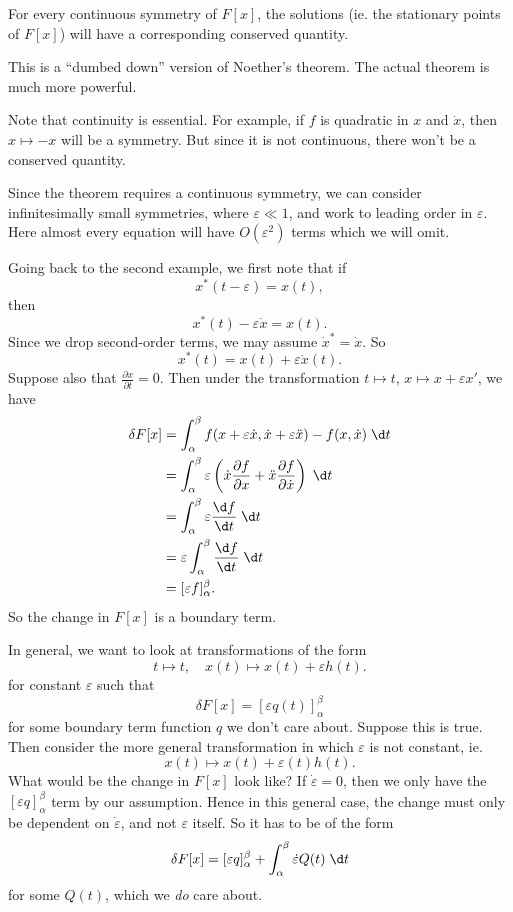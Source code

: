 \documentclass[a4paper]{article}
\begin{document}
\begin{thm}
  For every continuous symmetry of $F[x]$, the solutions (ie. the stationary points of $F[x]$) will have a corresponding conserved quantity.

  \note This is a ``dumbed down'' version of Noether's theorem. The actual theorem is much more powerful.
\end{thm}
Note that continuity is essential. For example, if $f$ is quadratic in $x$ and $\dot{x}$, then $x\mapsto -x$ will be a symmetry. But since it is not continuous, there won't be a conserved quantity.

Since the theorem requires a continuous symmetry,  we can consider infinitesimally small symmetries, where $\varepsilon \ll 1$, and work to leading order in $\varepsilon$. Here almost every equation will have $O(\varepsilon^2)$ terms which we will omit.

Going back to the second example, we first note that if
\[
  x^*(t - \varepsilon) = x(t),
\]
then
\[
  x^*(t) - \varepsilon\dot{x} = x(t).
\]
Since we drop second-order terms, we may assume $\dot{x}^* = \dot{x}$. So
\[
  x^*(t) = x(t) + \varepsilon \dot{x}(t).
\]
Suppose also that $\frac{\partial x}{\partial t} = 0$. Then under the transformation $t \mapsto t$, $x \mapsto x + \varepsilon x'$, we have
\begin{align*}
  \delta F[x] &= \int_\alpha^\beta f(x + \varepsilon \dot{x}, \dot{x} + \varepsilon \ddot{x}) - f(x, \dot{x})\;\d t\\
  &= \int_\alpha^\beta \varepsilon\left(\dot{x}\frac{\partial f}{\partial x} + \ddot{x} \frac{\partial f}{\partial \dot{x}}\right)\;\d t\\
  &= \int_\alpha^\beta \varepsilon\frac{\d f}{\d t}\;\d t\\
  &= \varepsilon\int_\alpha^\beta \frac{\d f}{\d t}\;\d t \\
  &= [\varepsilon f]_\alpha^\beta.
\end{align*}
So the change in $F[x]$ is a boundary term.

In general, we want to look at transformations of the form
\[
  t \mapsto t,\quad x(t) \mapsto x(t) + \varepsilon h(t).
\]
for constant $\varepsilon$ such that
\[
  \delta F[x] = [\varepsilon q(t)]_\alpha^\beta
\]
for some boundary term function $q$ we don't care about. Suppose this is true. Then consider the more general transformation in which $\varepsilon$ is not constant, ie.
\[
  x(t) \mapsto x(t) + \varepsilon(t)h(t).
\]
What would be the change in $F[x]$ look like? If $\dot{\varepsilon} = 0$, then we only have the $[\varepsilon q]_\alpha^\beta$ term by our assumption. Hence in this general case, the change must only be dependent on $\dot{\varepsilon}$, and not $\varepsilon$ itself. So it has to be of the form
\[
  \delta F[x] = [\varepsilon q]_\alpha^\beta + \int_\alpha^\beta \dot{\varepsilon} Q(t)\;\d t
\]
for some $Q(t)$, which we \emph{do} care about.
\end{document}
